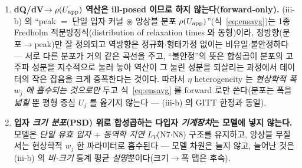 \begin{enumerate}[label=(\roman*),leftmargin=2.2em,itemsep=2.5pt]
\emph{산포} $\delta U_\mathrm{PSD}$ 인데, 이는 실측 폭 $w\sim RT/F\approx25.7$ mV 의 $1\%$ 미만이고,
이동 절대값 기준으로도 상한 $\gamma$$\cdot$최소 $r$ 에서 $3\%$ 를 넘지 못한다. tier C 상정의 견고성을
명시하면 --- $\Delta U\propto\gamma$ 라 상한을 다시 $5$ 배 과대 상정해도($\gamma=5$ J/m$^2$)
$\delta U_\mathrm{PSD}\approx1.0$ mV 로 결론(실측 폭 대비 수 \% 미만)은 불변이다. \emph{동역학 채널}:
흑연의 GITT 실측 확산계수 $D\approx10^{-11}$--$4\times10^{-10}$ cm$^2$/s\cite{park2021} 로 평형화
시간은 $\tau(5\,\mu\mathrm m)=r^2/D\approx6\times10^{2}$--$2.5\times10^{4}$ s 규모이나, 이
$\tau\propto r^2$ 분산은 $|I|\to0$ 평형 기준선에서 항등적으로 소멸하며(지연은 유한 전류의 산물,
\S\ref{sec:lag}), 유한 전류에서는 전이당 단일 유효 $L_V$(N7)의 입자별 산포로 들어오는 이차
보정 --- 이미 부차적인 꼬리 폭의 산포 --- 에 그친다. 따라서 마이크론 흑연에서 반경$\to$곡선 사상은 두 채널
모두 정량적으로 작고, 일반형~\eqref{eq:psdconv} 의 반경 의존이 커널에서 소거되어 PSD 적분은 항등이
되며, 앙상블에 남는 heterogeneity 는 비-크기 $\eta$ 산포 --- 곧 식~\eqref{eq:ensavg} --- 뿐이다.
(iii-b) 의 $\rho(U_\app)$ 를 \emph{비-크기} heterogeneity 전용으로
두는 것은 선언이 아니라 이 수치 유도의 따름 결과다. 크기 채널이 유의해지는 것은 $1/r$ 이 큰 나노
영역(상한 $\gamma$ 기준 $r\approx30$ nm 에서 $\Delta U\approx25$ mV; $\gamma\sim0.1$ 이면 그
십분의 일)뿐이며, 그 영역(과 양자가둠 밴드 shift 류)은 본 장의
범위에 포함하지 않는다. Dahn 등의 $x_{\max}=1-P$ 무질서
모델\cite{dahn1995}은 비-크기 구조 무질서가 실재함을 보이는 \emph{용량-한계 예시}일 뿐, inter-particle
$\eta$ 분포 형상을 정량하는 1차 근거는 아니다(분포 형상 tier C 근거미발견 --- intra-particle site-blocking
식을 과대인용하지 않는다).
\item \textbf{dQ/dV$\to\rho(U_{\mathrm{app}})$ 역산은 ill-posed 이므로 하지 않는다(forward-only).} (iii-b) 의 ``peak $=$
단일 입자 커널 $\circledast$ 앙상블 분포 $\rho(U_\app)$''(식~\eqref{eq:ensavg})는 1종 Fredholm 적분방정식(distribution
of relaxation times 와 동형)이라, 정방향(분포$\to$peak)만 잘 정의되고 역방향은 정규화$\cdot$형태가정 없이는
비유일$\cdot$불안정하다 --- 서로 다른 분포가 거의 같은 곡선을 주고, ``불안정''의 뜻은 합성곱이 분포의
고주파 성분을 지수적으로 눌러 놓아 역산이 그 눌린 성분을 되살리는 과정에서 데이터의 작은 잡음을 크게
증폭한다는 것이다. 따라서 $\eta$ heterogeneity 는
\emph{현상학적 폭 $w_j$ 에 흡수되는 것으로만} 두고 식~\eqref{eq:ensavg} 를 forward 로만 쓴다(분포는 폭을
\emph{넓힐} 뿐 평형 중심 $U_j$ 를 옮기지 않는다 --- (iii-b) 의 GITT 한정과 동일\cite{park2021}).
\item \textbf{입자 \emph{크기 분포}(PSD) 위로 합성곱하는 다입자 \emph{기계장치}는 모델에 넣지 않는다.} 모델은
\emph{단일 유효 입자 $+$ 동역학 지연 $L_V$}(N7$\cdot$N8) 구조를 유지하고, 앙상블 무질서는
현상학적 $w_j$ 한 파라미터로 흡수된다 --- 모델 차원은 늘지 않고, 늘어난 것은 (iii-b) 의 \emph{비-크기} 통계
평균 \emph{설명}뿐이다(크기$\to$폭 맵은 후속).
\end{enumerate}

